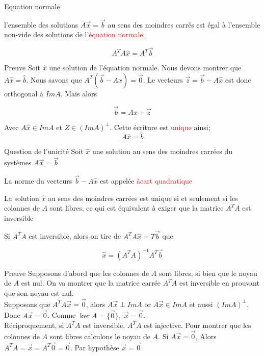\begin{parag}{Equation normale}
\begin{theoreme}
    

l'ensemble des solutions $A\vec{x} = \vec{b}$ au sens des moindres carrés est égal à l'ensemble non-vide des solutions de l'\textcolor{red}{équation normale}:
\begin{formule}
    \[A^TA\hat{x} = A^T\vec{b}\]
\end{formule}
\end{theoreme}
\begin{subparag}{Preuve}
    Soit $\hat{x}$ une solution de l'équation normale. Nous devons montrer que $A\hat{x} = \hat{b}$. Nous savons que $A^T(\vec{b} - A\hat{x}) = \vec{0}$. Le vecteurs $\vec{z} = \vec{b} - A\hat{x}$ est donc orthogonal à $ImA$. Mais alors 
    \begin{formule}
        \[\vec{b}  = A\hat{x} + \vec{z}\]
    \end{formule}
    Avec $A\hat{x}\in ImA$ et $Z \in (ImA)^\perp$. Cette écriture est \textcolor{red}{unique} ainsi;
    \[A\hat{x} = \hat{b}\]
\end{subparag}
\end{parag}
\begin{parag}{Question de l'unicité}
    Soit $\hat{x}$ une solution au sens des moindres carrées du systèmes $A\vec{x} = \vec{b}$
    \begin{definition}
        La norme du vecteurs $\vec{b}-A\hat{x}$ est appelée \textcolor{red}{àcart quadratique}
    \end{definition}
    \begin{theoreme}
        La solution $\hat{x}$ au sens des moindres carrées est unique si et seulement si les colonnes de $A$ sont libres, ce qui est équivalent à exiger que la matrice $A^TA$ est inversible
    \end{theoreme}
    Si $A^TA$ est inversible, alors on tire de $
    A^TA\hat{x} = T\vec{b}$ que 
    \begin{formule}
        \[\hat{x} = (A^TA)^{-1}A^T\vec{b}\]
    \end{formule}
    \begin{subparag}{Preuve}
        Supposons d'abord que les colonnes de $A$ sont libres, si bien que le noyau de $A$ est nul. On va montrer que la matrice carrée $A^TA$ est inversible en prouvant que son noyau est nul.
        \\
        Supposons que $A^TA\vec{x} = \vec{0}$, alors $A\vec{x} \perp ImA$ or $A\vec{x} \in ImA$ et aussi $(ImA)^\perp$. Donc $A\vec{x} = \vec{0}$. Comme $\ker A = \{\vec{0}\}, \; \vec{x} = \vec{0}$.
        \\
        Réciproquement, si $A^TA$ est inversible, $A^TA$ est injective. Pour montrer que les colonnes de $A$ sont libres calculons le noyau de $A$. Si $A\vec{x} = \vec{0}$, Alors $A^TA = \vec{x} = A^T\vec{0} = \vec{0}$. Par hypothèse $\vec{x} = \vec{0}$
    \end{subparag}
\end{parag}
